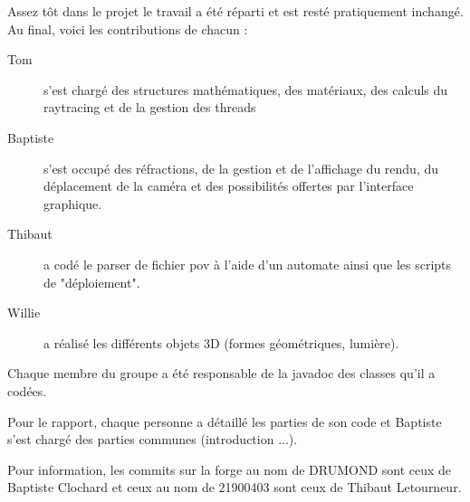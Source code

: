 Assez tôt dans le projet le travail a été réparti et est resté pratiquement inchangé. Au final, voici les contributions de chacun :
\begin{description}
    \item [Tom] s'est chargé des structures mathématiques, des matériaux, des calculs du raytracing et de la gestion des threads
    \item [Baptiste] s'est occupé des réfractions, de la gestion et de l'affichage du rendu, du déplacement de la caméra et des possibilités offertes par l'interface graphique.
    \item [Thibaut] a codé le parser de fichier pov à l'aide d'un automate ainsi que les scripts de "déploiement".
    \item [Willie] a réalisé les différents objets 3D (formes géométriques, lumière).
\end{description}

Chaque membre du groupe a été responsable de la javadoc des classes qu'il a codées.

Pour le rapport, chaque personne a détaillé les parties de son code et Baptiste s'est chargé des parties communes (introduction ...).

Pour information, les commits sur la forge au nom de DRUMOND sont ceux de Baptiste Clochard et ceux au nom de 21900403 sont ceux de Thibaut Letourneur.

